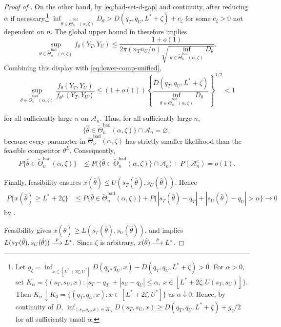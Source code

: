 \documentclass[12pt,reqno]{amsart}
\theoremstyle{theorem}
\theoremstyle{definition}
\newcommand{\0}{\mathbf{0}}
\newcommand{\1}{\mathbf{1}}
\begin{document}
\begin{proof}[Proof of ]
On the other hand, by \eqref{eq:bad-set-d-gap} and continuity, after reducing
\(\alpha\) if necessary,\footnote{Let
\(
g_\zeta
=
\inf_{x\in[L^*+2\zeta,U^*]}D(q_T,q_U,x)
-D(q_T,q_U,L^*+\zeta)>0 .
\)
For \(\alpha>0\), set
\(
K_\alpha
=
\{(s_T,s_U,x): |s_T-q_T|+|s_U-q_U|\le\alpha,\
x\in[L^*+2\zeta,U(s_T,s_U)]\}.
\)
Then \(K_\alpha\downarrow K_0=\{(q_T,q_U,x):x\in[L^*+2\zeta,U^*]\}\) as
\(\alpha\downarrow0\).  Hence, by continuity of \(D\),
\(
\inf_{(s_T,s_U,x)\in K_\alpha}D(s_T,s_U,x)
\ge D(q_T,q_U,L^*+\zeta)+g_\zeta/2
\)
for all sufficiently small \(\alpha\).}
\(
\inf_{\theta\in\widetilde\Theta^{\mathrm{bad}}_n(\alpha,\zeta)}D_\theta
>
D(q_T,q_U,L^*+\zeta) + c_\zeta
\)
for some $c_\zeta > 0$ not dependent on $n$.  The global upper bound in
\Cref{lem:ftheta-ratio} therefore
implies
\[
\sup_{\theta\in\widetilde\Theta^{\mathrm{bad}}_n(\alpha,\zeta)}
f_\theta(Y_T,Y_U)
\le
\frac{1+o(1)}
{2\pi(n_Tn_U/n)
\sqrt{\inf_{\theta\in\widetilde\Theta^{\mathrm{bad}}_n(\alpha,\zeta)}D_\theta}}.
\]
Combining this display with \eqref{eq:lower-comp-unified},
\[
\sup_{\theta\in\widetilde\Theta^{\mathrm{bad}}_n(\alpha,\zeta)}
\frac{f_\theta(Y_T,Y_U)}{f_{\theta^L}(Y_T,Y_U)}
\le
(1+o(1))
\left\{
\frac{D(q_T,q_U,L^*+\zeta)}
{\inf_{\theta\in\widetilde\Theta^{\mathrm{bad}}_n(\alpha,\zeta)}D_\theta}
\right\}^{1/2}
<1
\]
{for all sufficiently large \(n\) on \(\mathcal A_n\).  Thus, for
all sufficiently large \(n\),
\[
\{\hat\theta\in\widetilde\Theta^{\mathrm{bad}}_n(\alpha,\zeta)\}
\cap\mathcal A_n
=\varnothing,
\]
because every parameter in $\widetilde\Theta^{\mathrm{bad}}_n(\alpha,\zeta)$ has strictly
smaller likelihood than
the feasible competitor \(\theta^L\).  Consequently,
\[
\begin{aligned}
P\{\hat\theta\in\widetilde\Theta^{\mathrm{bad}}_n(\alpha,\zeta)\}
&\le
P\bigl(
\{\hat\theta\in\widetilde\Theta^{\mathrm{bad}}_n(\alpha,\zeta)\}
\cap\mathcal A_n
\bigr)
+P(\mathcal A_n^c) =o(1).
\end{aligned}
\]

Finally, feasibility ensures
\(x(\hat\theta)\le U(s_T(\hat\theta),s_U(\hat\theta))\).  Hence
\[
\begin{aligned}
P\{x(\hat\theta)\ge L^*+2\zeta\}
&\le
P\{\hat\theta\in\widetilde\Theta^{\mathrm{bad}}_n(\alpha,\zeta)\} + P\bigl\{
|s_T(\hat\theta)-q_T|+|s_U(\hat\theta)-q_U|>\alpha
\bigr\}
\to0
\end{aligned}
\]
by .}
Feasibility gives \(x(\hat\theta)\ge L(s_T(\hat\theta),s_U(\hat\theta))\), and
\Cref{lem:mle-margin-consistency} implies
$L(s_T(\hat\theta),s_U(\hat\theta))\overset{p}{\longrightarrow} L^*.
$ Since $\zeta$ is arbitrary,
 \(x(\hat\theta)\overset{p}{\longrightarrow} L^*\).


\end{proof}
\end{document}

